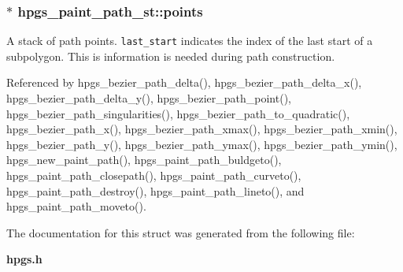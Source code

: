 \subsubsection[points]{$\ast$ {\bf hpgs\_\-paint\_\-path\_\-st::points}}\label{structhpgs__paint__path__st_8731bebc1e5715a5e4838035349afc3e}


A stack of path points. {\tt last\_\-start} indicates the index of the last start of a subpolygon. This is information is needed during path construction. 

Referenced by hpgs\_\-bezier\_\-path\_\-delta(), hpgs\_\-bezier\_\-path\_\-delta\_\-x(), hpgs\_\-bezier\_\-path\_\-delta\_\-y(), hpgs\_\-bezier\_\-path\_\-point(), hpgs\_\-bezier\_\-path\_\-singularities(), hpgs\_\-bezier\_\-path\_\-to\_\-quadratic(), hpgs\_\-bezier\_\-path\_\-x(), hpgs\_\-bezier\_\-path\_\-xmax(), hpgs\_\-bezier\_\-path\_\-xmin(), hpgs\_\-bezier\_\-path\_\-y(), hpgs\_\-bezier\_\-path\_\-ymax(), hpgs\_\-bezier\_\-path\_\-ymin(), hpgs\_\-new\_\-paint\_\-path(), hpgs\_\-paint\_\-path\_\-buldgeto(), hpgs\_\-paint\_\-path\_\-closepath(), hpgs\_\-paint\_\-path\_\-curveto(), hpgs\_\-paint\_\-path\_\-destroy(), hpgs\_\-paint\_\-path\_\-lineto(), and hpgs\_\-paint\_\-path\_\-moveto().

The documentation for this struct was generated from the following file:\begin{CompactItemize}
\item 
{\bf hpgs.h}\end{CompactItemize}
